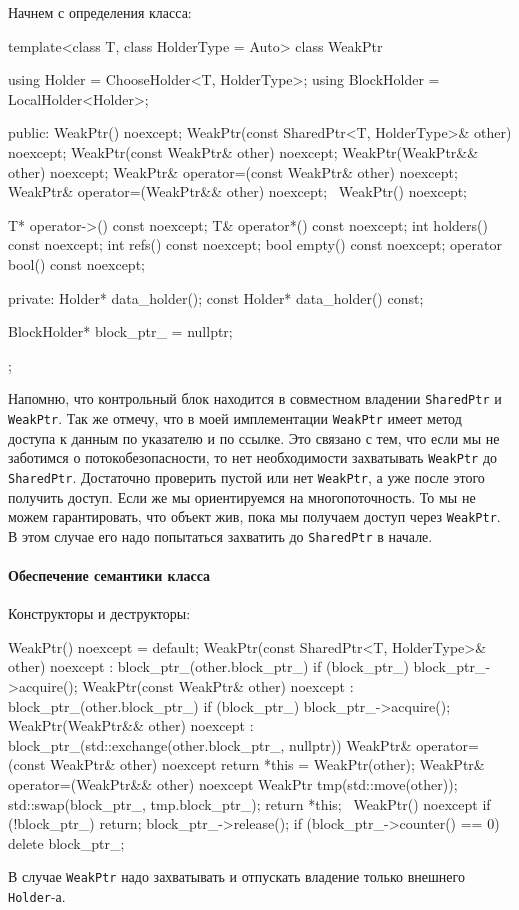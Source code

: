 Начнем с определения класса:
\begin{cppcode}
template<class T, class HolderType = Auto>
class WeakPtr {
  using Holder = ChooseHolder<T, HolderType>;
  using BlockHolder = LocalHolder<Holder>;

public:
  WeakPtr() noexcept;
  WeakPtr(const SharedPtr<T, HolderType>& other) noexcept;
  WeakPtr(const WeakPtr& other) noexcept;
  WeakPtr(WeakPtr&& other) noexcept;
  WeakPtr& operator=(const WeakPtr& other) noexcept;
  WeakPtr& operator=(WeakPtr&& other) noexcept;
  ~WeakPtr() noexcept;

  T* operator->() const noexcept;
  T& operator*() const noexcept;
  int holders() const noexcept;
  int refs() const noexcept;
  bool empty() const noexcept;
  operator bool() const noexcept;

private:
  Holder* data_holder();
  const Holder* data_holder() const;
  
  BlockHolder* block_ptr_ = nullptr;
};
\end{cppcode}
Напомню, что контрольный блок находится в совместном владении \verb"SharedPtr" и \verb"WeakPtr".
Так же отмечу, что в моей имплементации \verb"WeakPtr" имеет метод доступа к данным по указателю и по ссылке.
Это связано с тем, что если мы не заботимся о потокобезопасности, то нет необходимости захватывать \verb"WeakPtr" до \verb"SharedPtr".
Достаточно проверить пустой или нет \verb"WeakPtr", а уже после этого получить доступ.
Если же мы ориентируемся на многопоточность.
То мы не можем гарантировать, что объект жив, пока мы получаем доступ через \verb"WeakPtr".
В этом случае его надо попытаться захватить до \verb"SharedPtr" в начале.

\paragraph{Обеспечение семантики класса}

Конструкторы и деструкторы:
\begin{cppcode}
WeakPtr() noexcept = default;
WeakPtr(const SharedPtr<T, HolderType>& other) noexcept : block_ptr_(other.block_ptr_) {
  if (block_ptr_)
    block_ptr_->acquire();
}
WeakPtr(const WeakPtr& other) noexcept : block_ptr_(other.block_ptr_) {
  if (block_ptr_)
    block_ptr_->acquire();
}
WeakPtr(WeakPtr&& other) noexcept
    : block_ptr_(std::exchange(other.block_ptr_, nullptr)) {
}
WeakPtr& operator=(const WeakPtr& other) noexcept {
  return *this = WeakPtr(other);
}
WeakPtr& operator=(WeakPtr&& other) noexcept {
  WeakPtr tmp(std::move(other));
  std::swap(block_ptr_, tmp.block_ptr_);
  return *this;
}
~WeakPtr() noexcept {
  if (!block_ptr_)
    return;
  block_ptr_->release();
  if (block_ptr_->counter() == 0)
    delete block_ptr_;
}
\end{cppcode}
В случае \verb"WeakPtr" надо захватывать и отпускать владение только внешнего \verb"Holder"-а.

